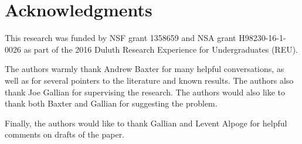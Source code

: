 \documentclass[11pt]{amsart}
\theoremstyle{definition}
\begin{document}
\section*{Acknowledgments}
This research was funded by NSF grant 1358659 and NSA grant H98230-16-1-0026
as part of the 2016 Duluth Research Experience for Undergraduates (REU).

The authors warmly thank Andrew Baxter for many helpful conversations,
as well as for several pointers to the literature and known results.
The authors also thank Joe Gallian for supervising the research.
The authors would also like to thank both Baxter and Gallian for suggesting the problem.

Finally, the authors would like to thank Gallian and Levent Alpoge
for helpful comments on drafts of the paper.



\end{document}
